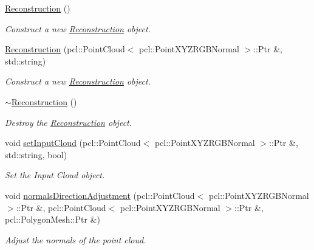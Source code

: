 \begin{DoxyCompactItemize}
\item 
\mbox{\label{classReconstruction_a081657a94b56a22f530f6661f356906a}} 
\hyperlink{classReconstruction_a081657a94b56a22f530f6661f356906a}{Reconstruction} ()
\begin{DoxyCompactList}\small\item\em Construct a new \hyperlink{classReconstruction}{Reconstruction} object. \end{DoxyCompactList}\item 
\hyperlink{classReconstruction_ac7ac62559b5825dcec2a760946897f40}{Reconstruction} (pcl\+::\+Point\+Cloud$<$ pcl\+::\+Point\+X\+Y\+Z\+R\+G\+B\+Normal $>$\+::Ptr \&, std\+::string)
\begin{DoxyCompactList}\small\item\em Construct a new \hyperlink{classReconstruction}{Reconstruction} object. \end{DoxyCompactList}\item 
\mbox{\label{classReconstruction_a039a0f69fa30bd88ffadf608846a316d}} 
\hyperlink{classReconstruction_a039a0f69fa30bd88ffadf608846a316d}{$\sim$\+Reconstruction} ()
\begin{DoxyCompactList}\small\item\em Destroy the \hyperlink{classReconstruction}{Reconstruction} object. \end{DoxyCompactList}\item 
void \hyperlink{classReconstruction_a8be86587dfe645c245474315ae67f5e4}{set\+Input\+Cloud} (pcl\+::\+Point\+Cloud$<$ pcl\+::\+Point\+X\+Y\+Z\+R\+G\+B\+Normal $>$\+::Ptr \&, std\+::string, bool)
\begin{DoxyCompactList}\small\item\em Set the Input Cloud object. \end{DoxyCompactList}\item 
void \hyperlink{classReconstruction_a16d79600ed8684f67c1c56456bd9142b}{normals\+Direction\+Adjustment} (pcl\+::\+Point\+Cloud$<$ pcl\+::\+Point\+X\+Y\+Z\+R\+G\+B\+Normal $>$\+::Ptr \&, pcl\+::\+Point\+Cloud$<$ pcl\+::\+Point\+X\+Y\+Z\+R\+G\+B\+Normal $>$\+::Ptr \&, pcl\+::\+Polygon\+Mesh\+::\+Ptr \&)
\begin{DoxyCompactList}\small\item\em Adjust the normals of the point cloud. \end{DoxyCompactList}\item 

\end{DoxyCompactItemize}
